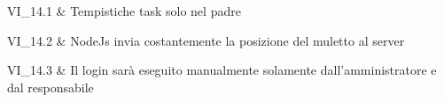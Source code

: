 VI\_14.1 & Tempistiche task solo nel padre

\tabularnewline 

VI\_14.2 & NodeJs invia costantemente la posizione del muletto al server

\tabularnewline 

VI\_14.3 & Il login sarà eseguito manualmente solamente dall'amministratore e dal responsabile


